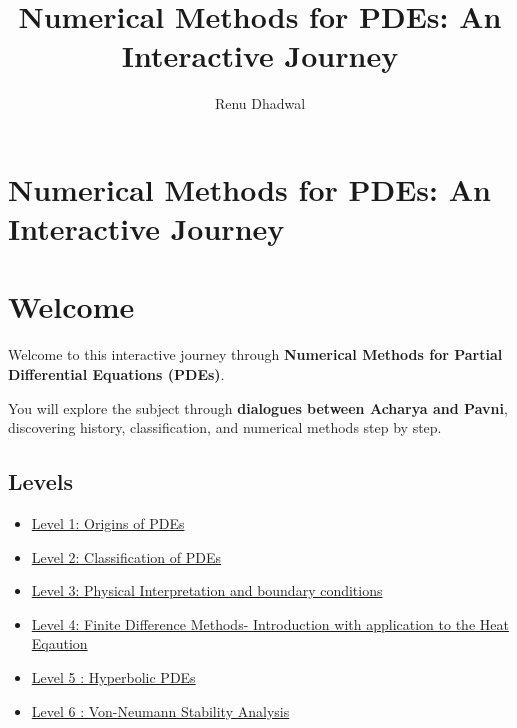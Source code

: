 \documentclass[
  letterpaper,
]{book}
\title{Numerical Methods for PDEs: An Interactive Journey}
\author{Renu Dhadwal}
\date{}
\providecommand{\tightlist}{%
  \setlength{\itemsep}{0pt}\setlength{\parskip}{0pt}}
\renewcommand*\contentsname{Table of contents}
\newcommand\contentsname{Table of contents}
\begin{document}
\frontmatter
\maketitle

\renewcommand*\contentsname{Table of contents}
{
\setcounter{tocdepth}{2}
\tableofcontents
}

\mainmatter
{}

\chapter{Numerical Methods for PDEs: An Interactive
Journey}\label{numerical-methods-for-pdes-an-interactive-journey}


\chapter{Welcome}\label{welcome}

Welcome to this interactive journey through \textbf{Numerical Methods
for Partial Differential Equations (PDEs)}.

You will explore the subject through \textbf{dialogues between Acharya
and Pavni}, discovering history, classification, and numerical methods
step by step.

\section{Levels}\label{levels}

\begin{itemize}
\tightlist
\item
  \href{chapters/level1_history_pdes.qmd}{Level 1: Origins of PDEs}
\item
  \href{chapters/Level2_classification_pdes.qmd}{Level 2: Classification
  of PDEs}
\item
  \href{chapters/level3_PDE_BCs.qmd}{Level 3: Physical Interpretation
  and boundary conditions}
\item
  \href{chapters/level4_finite_differences.qmd}{Level 4: Finite
  Difference Methods- Introduction with application to the Heat
  Eqaution}
\item
  \href{chapters/level5_Wave_Equation.qmd}{Level 5 : Hyperbolic PDEs}
\item
  \href{chapters/level6_von_neumann.qmd}{Level 6 : Von-Neumann Stability
  Analysis}
\end{itemize}
\end{document}
